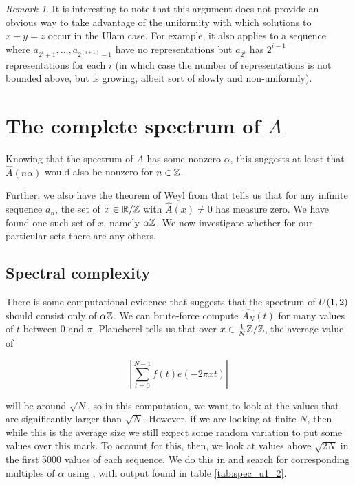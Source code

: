 \documentclass{report}
\theoremstyle{remark}
\newtheorem{remark}{Remark}
\numberwithin{equation}{section}
\begin{document}
\begin{remark}
  It is interesting to note that this argument does not provide an
  obvious way to take advantage of the uniformity with which solutions
  to $x+y=z$ occur in the Ulam case.  For example, it also applies to
  a sequence where $a_{2^i+1}, \ldots, a_{2^(i+1)-1}$ have no
  representations but $a_{2^i}$ has $2^{i-1}$ representations for each
  $i$ (in which case the number of representations is not bounded
  above, but is growing, albeit sort of slowly and non-uniformly).
\end{remark}

\section{The complete spectrum of $A$}

Knowing that the spectrum of $A$ has some nonzero $\alpha$, this
suggests at least that $\widehat{A}(n\alpha)$ would also be nonzero
for $n \in \mathbb{Z}$.  

Further, we also have the theorem of Weyl from \cite{weyl:ann1916}
that tells us that for any infinite sequence $a_n$, the set of
$x \in \mathbb{R}/\mathbb{Z}$ with $\widehat{A}(x) \neq 0$ has measure zero.  We have
found one such set of $x$, namely $\alpha\mathbb{Z}$.  We now investigate
whether for our particular \relevant sets there are any others.

\subsection{Spectral complexity}

There is some computational evidence that suggests that the spectrum
of $U(1,2)$ should consist only of $\alpha\mathbb{Z}$.  We can
brute-force compute $\widehat{A_N}(t)$ for many values of $t$ between
0 and $\pi$.  Plancherel tells us that over $x \in \frac1{N}\mathbb{Z}/\mathbb{Z}$,
the average value of

\[\left|\sum_{t=0}^{N-1} f(t) e(-2\pi xt)\right|\]

will be around $\sqrt{N}$, so in this computation, we want to look at
the values that are significantly larger than $\sqrt{N}$.  However, if
we are looking at finite $N$, then while this is the average size we
still expect some random variation to put some values over this mark.
To account for this, then, we look at values above $\sqrt{2N}$ in the
first 5000 values of each sequence.  We do this in 
and search for corresponding multiples of $\alpha$ using
, with output found in table \ref{tab:spec_u1_2}.  
\end{document}

